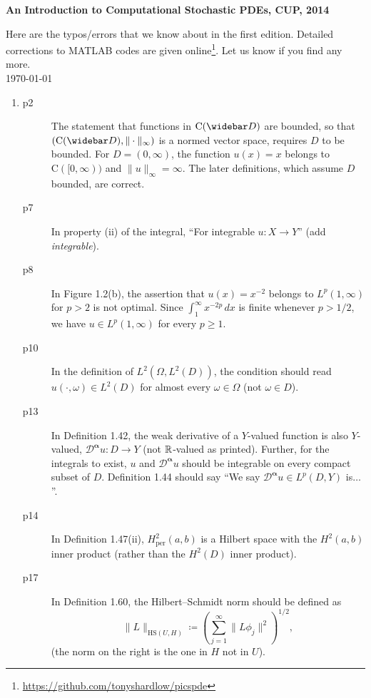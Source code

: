 \documentclass[final]{article}
\theoremstyle{definition}
\newcommand{\vecbs}[1]{\boldsymbol{#1}}
\renewcommand{\vec}[1]{{\vecbs{#1}}}
\begin{document}
\begin{center}
  \textbf{\Huge An Introduction to Computational Stochastic PDEs,
    CUP, 2014}\\[2ex]
\end{center}
Here are the typos/errors that we know about in the first edition.  Detailed corrections to MATLAB codes are given
online\footnote{\url{https://github.com/tonyshardlow/picspde}}. Let
us know if you find any more.\\
\today

 \begin{enumerate}
 \item %
   \begin{description}
   \item[p2] The statement that functions in $\mathrm{C}(\widebar D)$ are bounded,
so that $(\mathrm{C}(\widebar D),\|\cdot\|_\infty)$ is a normed vector space,
requires $D$ to be bounded. For $D=(0,\infty)$, the function $u(x)=x$ belongs
to $\mathrm{C}([0,\infty))$ and $\|u\|_\infty=\infty$. The later definitions,
which assume $D$ bounded, are correct.
   \item[p7] In property (ii) of the integral, ``For integrable $u\colon X\to Y$'' (add \emph{integrable}).
   \item[p8] In Figure 1.2(b), the assertion that $u(x)=x^{-2}$ belongs to
${L}^p(1,\infty)$ for $p>2$ is not optimal. Since $\int_1^\infty x^{-2p}\,dx$ is
finite whenever $p>1/2$, we have $u\in {L}^p(1,\infty)$ for every $p\ge 1$. 
   \item[p10] In the definition of ${L}^2(\Omega,{L}^2(D))$, the
condition should read $u(\cdot,\omega)\in {L}^2(D)$ for almost every
$\omega\in\Omega$ (not $\omega\in D$).
   \item[p13] In Definition 1.42, the weak derivative of a $Y$-valued function
is also $Y$-valued, $\mathcal{D}^{\vec\alpha}u\colon D\to Y$ (not ${{\mathbb{R}}}$-valued as printed). Further, for the integrals to
exist, $u$ and $\mathcal{D}^{\vec\alpha}u$ should be integrable on every
compact subset of $D$.  Definition 1.44 should say ``We say $\mathcal{D}^{\vec\alpha}u\in L^p(D,Y)$ is$\dots$''.
   \item[p14] In Definition 1.47(ii), $H^2_{\mathrm{per}}(a,b)$ is a Hilbert
space with the $H^2(a,b)$ inner product (rather than the $H^2(D)$ inner product).
   \item[p17] In Definition 1.60, the Hilbert–Schmidt norm should be defined as
\[
\|L\|_{\mathrm{HS}(U,H)}
\coloneq
 \left(\sum_{
j=1} 
^\infty \|L\phi_j\|^2\right)^{1/2}
,
\]
(the norm on the right is the one in $H$ not in $U$).

\end{description}
\end{enumerate}
\end{document}
